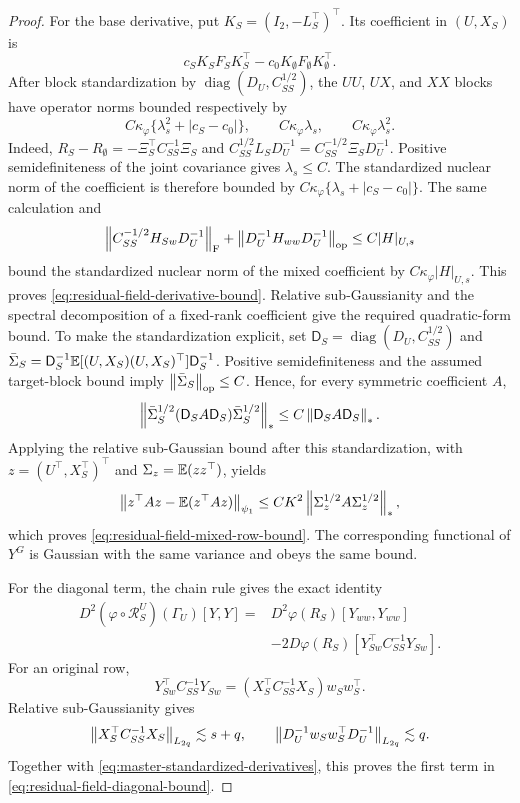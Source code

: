 \begin{proof}
For the base derivative, put $K_S=(I_2,-L_S^\top)^\top$.  Its coefficient
in $(U,X_S)$ is
\[
 c_SK_SF_SK_S^\top-c_0K_\emptyset F_\emptyset K_\emptyset^\top.
\]
After block standardization by $\operatorname{diag}(D_U,C_{SS}^{1/2})$,
the $UU$, $UX$, and $XX$ blocks have operator norms bounded respectively
by
\[
 C\kappa_\varphi\{\lambda_s^2+|c_S-c_0|\},
 \qquad C\kappa_\varphi\lambda_s,
 \qquad C\kappa_\varphi\lambda_s^2.
\]
Indeed,
$R_S-R_\emptyset=-\Xi_S^\top C_{SS}^{-1}\Xi_S$ and
$C_{SS}^{1/2}L_SD_U^{-1}=C_{SS}^{-1/2}\Xi_SD_U^{-1}$.
Positive semidefiniteness of the joint covariance gives
$\lambda_s\le C$.  The standardized nuclear norm of the coefficient is
therefore bounded by
$C\kappa_\varphi\{\lambda_s+|c_S-c_0|\}$.  The same calculation and
\[
 \left\lVert C_{SS}^{-1/2}H_{Sw}D_U^{-1}\right\rVert_{\mathrm F}
 +\left\lVert D_U^{-1}H_{ww}D_U^{-1}\right\rVert_{\mathrm{op}}
 \le C|H|_{U,s}
\]
bound the standardized nuclear norm of the mixed coefficient by
$C\kappa_\varphi|H|_{U,s}$.  This proves
\eqref{eq:residual-field-derivative-bound}.  Relative sub-Gaussianity and
the spectral decomposition of a fixed-rank coefficient give the required
quadratic-form bound.  To make the standardization explicit, set
$\mathsf D_S=\operatorname{diag}(D_U,C_{SS}^{1/2})$ and
$\bar\Sigma_S=\mathsf D_S^{-1}\mathbb E[(U,X_S)(U,X_S)^\top]\mathsf D_S^{-1}$.
Positive semidefiniteness and the assumed target-block bound imply
$\left\lVert \bar\Sigma_S\right\rVert_{\mathrm{op}}\le C$.  Hence, for every symmetric
coefficient $A$,
\[
 \left\lVert \bar\Sigma_S^{1/2}(\mathsf D_SA\mathsf D_S)
       \bar\Sigma_S^{1/2}\right\rVert_*
 \le C\left\lVert \mathsf D_SA\mathsf D_S\right\rVert_*.
\]
Applying the relative sub-Gaussian bound after this standardization, with
$z=(U^\top,X_S^\top)^\top$ and $\Sigma_z=\mathbb E(zz^\top)$, yields
\[
 \left\lVert z^\top Az-\mathbb E(z^\top Az)\right\rVert_{\psi_1}
 \le CK^2\left\lVert \Sigma_z^{1/2}A\Sigma_z^{1/2}\right\rVert_*,
\]
which proves \eqref{eq:residual-field-mixed-row-bound}.  The corresponding
functional of $Y^G$ is Gaussian with the same variance and obeys the same
bound.

For the diagonal term, the chain rule gives the exact identity
\begin{equation}\label{eq:residual-diagonal-formula}
\begin{split}
 D^2(\varphi\circ\mathcal R_S^U)(\Gamma_U)[Y,Y]
 ={}&D^2\varphi(R_S)[Y_{ww},Y_{ww}]\\
 &-2D\varphi(R_S)
 [Y_{Sw}^\top C_{SS}^{-1}Y_{Sw}].
\end{split}
\end{equation}
For an original row,
\[
 Y_{Sw}^\top C_{SS}^{-1}Y_{Sw}
 =(X_S^\top C_{SS}^{-1}X_S)w_Sw_S^\top.
\]
Relative sub-Gaussianity gives
\[
 \left\lVert X_S^\top C_{SS}^{-1}X_S\right\rVert_{L_{2q}}\lesssim s+q,
 \qquad
 \left\lVert D_U^{-1}w_Sw_S^\top D_U^{-1}\right\rVert_{L_{2q}}\lesssim q.
\]
Together with \eqref{eq:master-standardized-derivatives}, this proves the
first term in \eqref{eq:residual-field-diagonal-bound}.


\end{proof}
